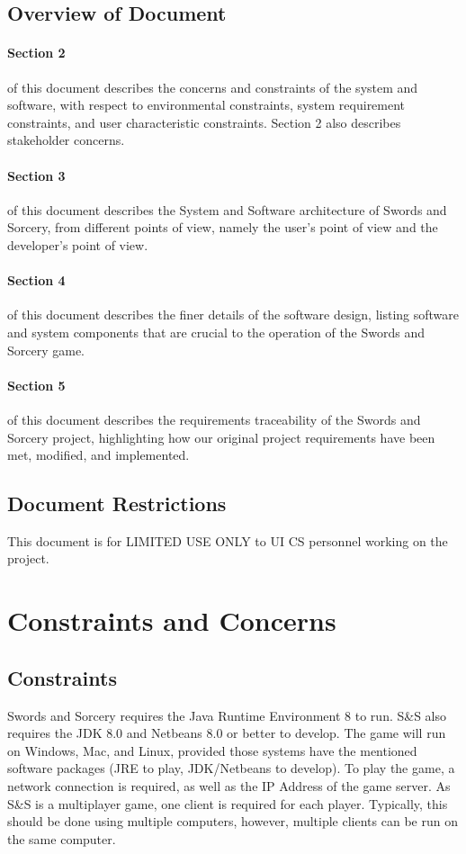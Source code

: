 \documentclass[12pt,a4paper]{article}
\begin{document}
\subsection{Overview of Document}
\paragraph{Section 2} of this document describes the concerns and constraints of the system and software, with respect to environmental constraints, system requirement constraints, and user characteristic constraints. Section 2 also describes stakeholder concerns.
\paragraph{Section 3} of this document describes the System and Software architecture of Swords and Sorcery, from different points of view, namely the user's point of view and the developer's point of view.
\paragraph{Section 4} of this document describes the finer details of the software design, listing software and system components that are crucial to the operation of the Swords and Sorcery game. 
\paragraph{Section 5} of this document describes the requirements traceability of the Swords and Sorcery project, highlighting how our original project requirements have been met, modified, and implemented.
\subsection{Document Restrictions}
This document is for LIMITED USE ONLY to UI CS personnel working on the project.
\section{Constraints and Concerns}

\subsection{Constraints}
Swords and Sorcery requires the Java Runtime Environment 8 to run. S\&S also requires the JDK 8.0 and Netbeans 8.0 or better to develop. The game will run on Windows, Mac, and Linux, provided those systems have the mentioned software packages (JRE to play, JDK/Netbeans to develop). To play the game, a network connection is required, as well as the IP Address of the game server. As S\&S is a multiplayer game, one client is required for each player. Typically, this should be done using multiple computers, however, multiple clients can be run on the same computer.
\end{document}
